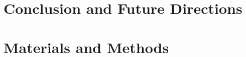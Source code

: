 \documentclass{article}
\begin{document}
\section{Conclusion and Future Directions}
\label{sec:conclusion}


\section{Materials and Methods}
\label{sec:methods}


\clearpage %

%



\end{document}

